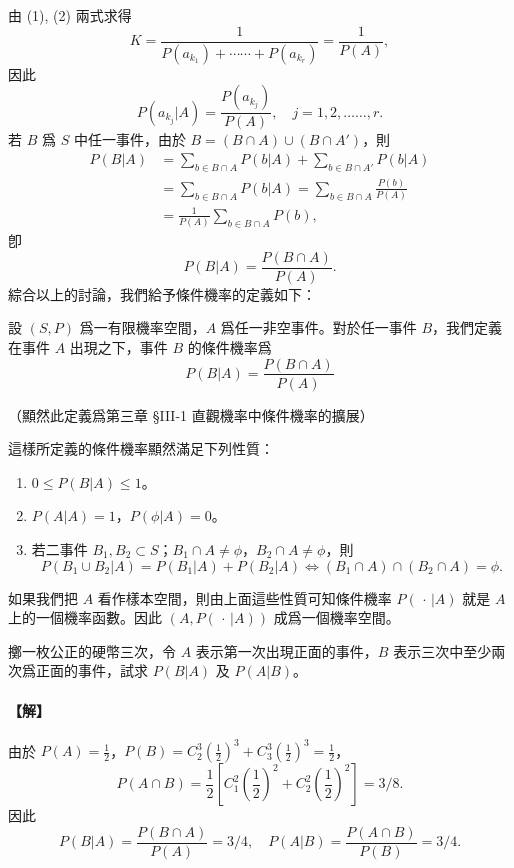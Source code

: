 由 (1), (2) 兩式求得
\[
K = \frac{1}{P(a_{k_1}) + \cdots\cdots + P(a_{k_r})} = \frac{1}{P(A)},
\]
因此
\begin{equation}\tag{3}\label{eq:b5s-4-3}
P(a_{k_j}|A) = \frac{P(a_{k_j})}{P(A)}, \quad j = 1, 2, \dots\dots, r.
\end{equation}
若 $B$ 爲 $S$ 中任一事件，由於 $B = (B \cap A) \cup (B \cap A')$，則
\begin{align*}
P(B|A) &= \sum_{b \in B \cap A} P(b|A) + \sum_{b \in B \cap A'} P(b|A) \\
&= \sum_{b \in B \cap A} P(b|A) = \sum_{b \in B \cap A} \frac{P(b)}{P(A)} \\
&= \frac{1}{P(A)} \sum_{b \in B \cap A} P(b),
\end{align*}
卽
\[
P(B|A) = \frac{P(B \cap A)}{P(A)}.
\]
綜合以上的討論，我們給予條件機率的定義如下：

\medskip
\begin{definition*}
設 $(S, P)$ 爲一有限機率空間，$A$ 爲任一非空事件。對於任一事件 $B$，我們定義在事件 $A$ 出現之下，事件 $B$ 的條件機率爲
\begin{equation}\tag{4}\label{eq:b5s-4-4}
P(B|A) = \frac{P(B \cap A)}{P(A)}
\end{equation}
\end{definition*}
（顯然此定義爲第三章 §III-1 直觀機率中條件機率的擴展）

這樣所定義的條件機率顯然滿足下列性質：
\begin{enumerate}[label=\Roman*., itemsep=2pt, topsep=2pt]
  \item $0 \le P(B|A) \le 1$。
  \item $P(A|A) = 1$，\quad $P(\phi|A) = 0$。
  \item 若二事件 $B_1, B_2 \subset S$；$B_1 \cap A \neq \phi$，$B_2 \cap A \neq \phi$，則
  \[
  P(B_1 \cup B_2|A) = P(B_1|A) + P(B_2|A) \iff (B_1 \cap A) \cap (B_2 \cap A) = \phi.
  \]
\end{enumerate}

如果我們把 $A$ 看作樣本空間，則由上面這些性質可知條件機率 $P(\,\cdot\,|A)$ 就是 $A$ 上的一個機率函數。因此 $(A, P(\,\cdot\,|A))$ 成爲一個機率空間。

\medskip
\begin{example}\label{ex:b5s-4-6}
擲一枚公正的硬幣三次，令 $A$ 表示第一次出現正面的事件，$B$ 表示三次中至少兩次爲正面的事件，試求 $P(B|A)$ 及 $P(A|B)$。
\end{example}
\paragraph{【解】}
由於 $P(A) = \frac{1}{2}$，$P(B) = C_2^3 \left(\frac{1}{2}\right)^3 + C_3^3 \left(\frac{1}{2}\right)^3 = \frac{1}{2}$，
\[
P(A \cap B) = \frac{1}{2}\left[ C_1^2 \left(\frac{1}{2}\right)^2 + C_2^2 \left(\frac{1}{2}\right)^2 \right] = 3/8.
\]
因此
\[
P(B|A) = \frac{P(B \cap A)}{P(A)} = 3/4, \quad P(A|B) = \frac{P(A \cap B)}{P(B)} = 3/4. \tag*{\#}
\]

